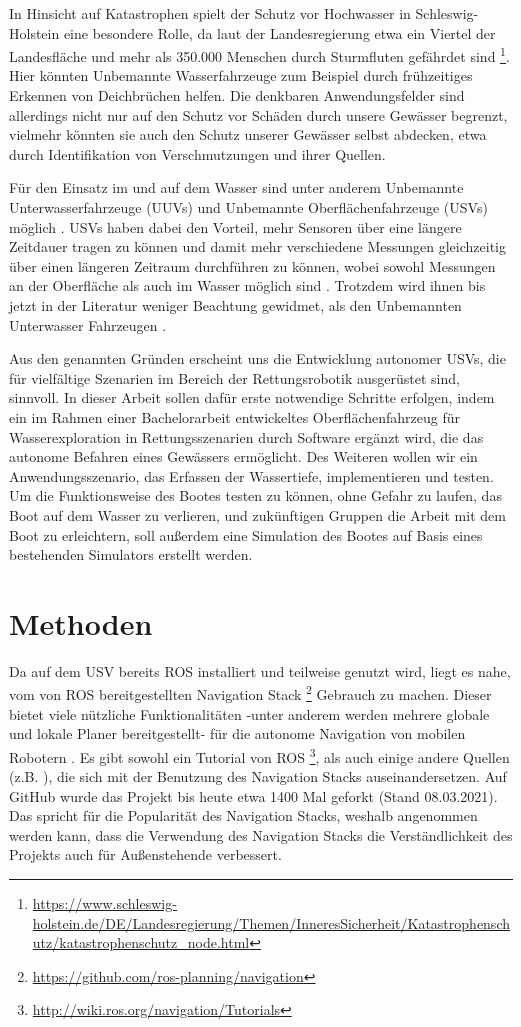 \documentclass[11pt]{article}
\begin{document}
In Hinsicht auf Katastrophen spielt der Schutz vor Hochwasser in Schleswig-Holstein eine besondere Rolle, da laut der Landesregierung etwa ein Viertel der Landesfläche und mehr als 350.000 Menschen durch Sturmfluten gefährdet sind \footnote{\url{https://www.schleswig-holstein.de/DE/Landesregierung/Themen/InneresSicherheit/Katastrophenschutz/katastrophenschutz_node.html}}. Hier könnten Unbemannte Wasserfahrzeuge zum Beispiel durch frühzeitiges Erkennen von Deichbrüchen helfen. Die denkbaren Anwendungsfelder sind allerdings nicht nur auf den Schutz vor Schäden durch unsere Gewässer begrenzt, vielmehr könnten sie auch den Schutz unserer Gewässer selbst abdecken, etwa durch Identifikation von Verschmutzungen und ihrer Quellen.

Für den Einsatz im und auf dem Wasser sind unter anderem Unbemannte Unterwasserfahrzeuge (UUVs) und Unbemannte Oberflächenfahrzeuge (USVs) möglich \cite{surveyDisasterRobotics}. USVs haben dabei den Vorteil, mehr Sensoren über eine längere Zeitdauer tragen zu können und damit mehr verschiedene Messungen gleichzeitig über einen längeren Zeitraum durchführen zu können, wobei sowohl Messungen an der Oberfläche als auch im Wasser möglich sind \cite{coley2015}. Trotzdem wird ihnen bis jetzt in der Literatur weniger Beachtung gewidmet, als den Unbemannten Unterwasser Fahrzeugen \cite{surveyDisasterRobotics}.

Aus den genannten Gründen erscheint uns die Entwicklung autonomer USVs, die für vielfältige Szenarien im Bereich der Rettungsrobotik ausgerüstet sind, sinnvoll. In dieser Arbeit sollen dafür erste notwendige Schritte erfolgen, indem ein im Rahmen einer Bachelorarbeit entwickeltes Oberflächenfahrzeug für Wasserexploration in Rettungsszenarien durch Software ergänzt wird, die das autonome Befahren eines Gewässers ermöglicht. Des Weiteren wollen wir ein Anwendungsszenario, das Erfassen der Wassertiefe, implementieren und testen. Um die Funktionsweise des Bootes testen zu können, ohne Gefahr zu laufen, das Boot auf dem Wasser zu verlieren, und zukünftigen Gruppen die Arbeit mit dem Boot zu erleichtern, soll außerdem eine Simulation des Bootes auf Basis eines bestehenden Simulators erstellt werden.

\section{Methoden}
Da auf dem USV bereits ROS installiert und teilweise genutzt wird, liegt es nahe, vom von ROS bereitgestellten Navigation Stack \footnote{\url{https://github.com/ros-planning/navigation}} Gebrauch zu machen. Dieser bietet viele nützliche Funktionalitäten -unter anderem werden mehrere globale und lokale Planer bereitgestellt- für die autonome Navigation von mobilen Robotern \cite{zheng2019ros}. Es gibt sowohl ein Tutorial von ROS \footnote{\url{http://wiki.ros.org/navigation/Tutorials}}, als auch einige andere Quellen (z.B. \cite{zheng2019ros}), die sich mit der Benutzung des Navigation Stacks auseinandersetzen. Auf GitHub wurde das Projekt bis heute etwa 1400 Mal geforkt (Stand 08.03.2021). Das spricht für die Popularität des Navigation Stacks, weshalb angenommen werden kann, dass die Verwendung des Navigation Stacks die Verständlichkeit des Projekts auch für Außenstehende verbessert.
\end{document}
